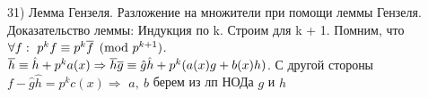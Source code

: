 31) Лемма Гензеля. Разложение на множители при помощи леммы Гензеля.\\

    Доказательство леммы: Индукция по k. Строим для k + 1. Помним, что $\forall f:~p^{k}f \equiv p^{k}\overline{f} \pmod{p^{k + 1}}$.\\
    $\overline{h} \equiv \hat{h}+p^ka(x) \Rightarrow \overline{h}\overline{g} \equiv \hat{g}\hat{h} + p^{k}(a(x)g + b(x)h)$. С другой стороны $f-\hat{g}\hat{h}=p^kc(x) \Rightarrow$ $a,~b$ берем из лп НОДа $g$ и $h$\\
